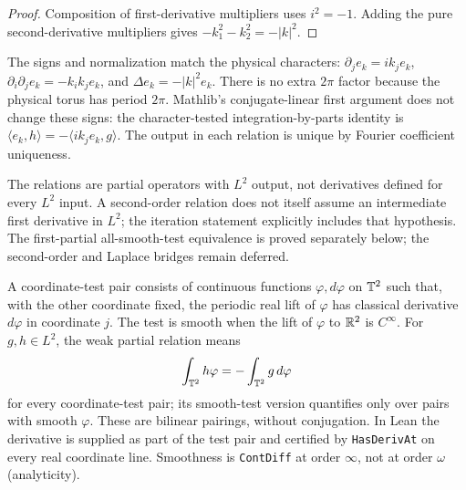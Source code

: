 \begin{proof}
\leanok
Composition of first-derivative multipliers uses $i^2=-1$.
Adding the pure second-derivative multipliers gives
$-k_1^2-k_2^2=-|k|^2$.
\end{proof}

\begin{remark}
The signs and normalization match the physical characters:
$\partial_j e_k=ik_j e_k$, $\partial_i\partial_j e_k=-k_i k_j e_k$,
and $\Delta e_k=-|k|^2e_k$. There is no extra $2\pi$ factor because the
physical torus has period $2\pi$. Mathlib's conjugate-linear first argument
does not change these signs: the character-tested integration-by-parts
identity is $\langle e_k,h\rangle=-\langle ik_j e_k,g\rangle$.
The output in each relation is unique by Fourier coefficient uniqueness.

The relations are partial operators with $L^2$ output, not derivatives
defined for every $L^2$ input. A second-order relation does not itself assume
an intermediate first derivative in $L^2$; the iteration statement explicitly
includes that hypothesis. The first-partial all-smooth-test equivalence is
proved separately below; the second-order and Laplace bridges remain deferred.
\end{remark}

\begin{definition}
\label{def:classical-tests}
\leanok
A coordinate-test pair consists of continuous functions $\varphi,d\varphi$
on $\mathbb{T}^2$ such that, with the other coordinate fixed, the periodic real lift
of $\varphi$ has classical derivative $d\varphi$ in coordinate $j$.
The test is smooth when the lift of $\varphi$ to $\mathbb{R}^2$ is $C^\infty$.
For $g,h\in L^2$, the weak partial relation means
\[
 \int_{\mathbb{T}^2}h\varphi=-\int_{\mathbb{T}^2}g\,d\varphi
\]
for every coordinate-test pair; its smooth-test version quantifies only over
pairs with smooth $\varphi$. These are bilinear pairings, without conjugation.
In Lean the derivative is supplied as part of the test pair and certified by
\texttt{HasDerivAt} on every real coordinate line. Smoothness is
\texttt{ContDiff} at order $\infty$, not at order $\omega$ (analyticity).
\end{definition}

